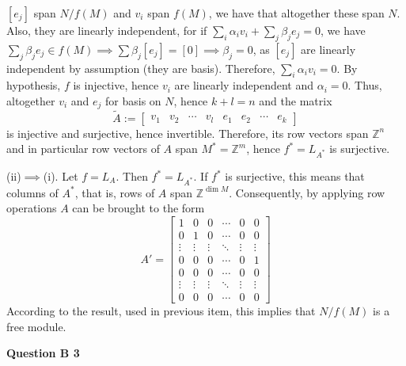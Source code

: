 \documentclass[8pt]{article} %
\newcommand{\questionB}[1]{\noindent\textbf{Question B #1}\par}
\begin{document}
\begin{enumerate}[label=(\arabic*)]
{		$[e_j]$ span $N/f(M)$ and $v_i$ span $f(M)$, we have that altogether these span $N$. Also, they are linearly independent,
		for if $\sum_i\alpha_iv_i+\sum_j\beta_je_j=0$, we have $\sum_j\beta_je_j\in f(M)\implies\sum\beta_j[e_j]=[0]\implies \beta_j=0$,
		as $[e_j]$ are linearly independent by assumption (they are basis). Therefore, $\sum_i\alpha_iv_i=0$. By hypothesis,
		$f$ is injective, hence $v_i$ are linearly independent and $\alpha_i=0$. Thus, altogether $v_i$ and $e_j$ for basis
		on $N$, hence $k+l=n$ and the matrix
		\[\tilde{A}:=\begin{bmatrix}v_1&v_2&\cdots&v_l&e_1&e_2&\cdots&e_k\end{bmatrix}\]
		is injective and surjective, hence invertible. Therefore, its row vectors span $\mathbb{Z}^n$ and
		in particular row vectors of $A$ span $M^*=\mathbb{Z}^m$, hence $f^*=L_{A^*}$ is surjective.

	(ii)$\implies$(i). Let $f=L_A$. Then $f^*=L_{A^*}$. If $f^*$ is surjective, this means that columns of $A^*$, that is,
	rows of $A$ span $\mathbb{Z}^{\dim M}$. Consequently, by applying row operations $A$ can be brought to the form
	\[A'=\begin{bmatrix}
		1&0&0&\cdots&0&0\\
		0&1&0&\cdots&0&0\\
		\vdots&\vdots&\vdots&\ddots&\vdots&\vdots\\
		0&0&0&\cdots&0&1\\
		0&0&0&\cdots&0&0\\
		\vdots&\vdots&\vdots&\ddots&\vdots&\vdots\\
		0&0&0&\cdots&0&0
	\end{bmatrix}
	\]
	According to the result, used in previous item, this implies that $N/f(M)$ is a free module.
	}
\end{enumerate}
\questionB{3}
\end{document}
